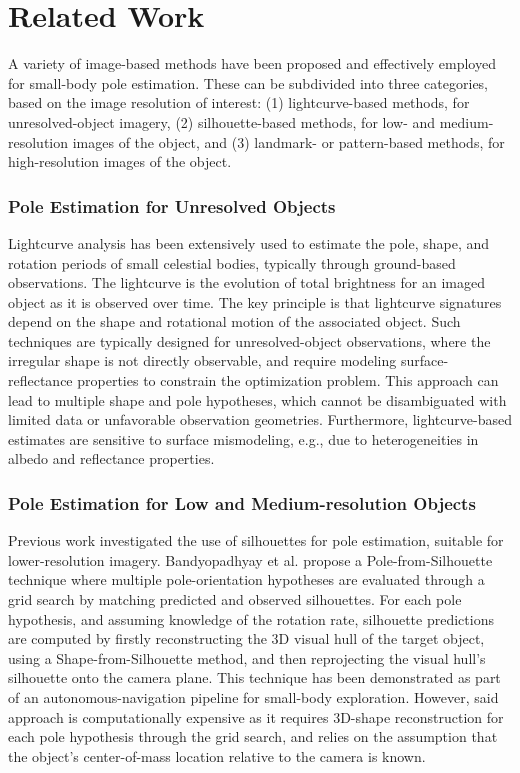 \section{Related Work}
A variety of image-based methods have been proposed and effectively employed for small-body pole estimation. These can be subdivided into three categories, based on the image resolution of interest: (1) lightcurve-based methods, for unresolved-object imagery, (2) silhouette-based methods, for low- and medium-resolution images of the object, and (3) landmark- or pattern-based methods, for high-resolution images of the object.

\subsubsection{Pole Estimation for Unresolved Objects}
Lightcurve analysis has been extensively used to estimate the pole, shape, and rotation periods of small celestial bodies, typically through ground-based observations\cite{kaasalainen2001optimization,chng2022globally}. The lightcurve is the evolution of total brightness for an imaged object as it is observed over time. The key principle is that lightcurve signatures depend on the shape and rotational motion of the associated object. Such techniques are typically designed for unresolved-object observations, where the irregular shape is not directly observable, and require modeling surface-reflectance properties to constrain the optimization problem. This approach can lead to multiple shape and pole hypotheses, which cannot be disambiguated with limited data or unfavorable observation geometries. Furthermore, lightcurve-based estimates are sensitive to surface mismodeling, e.g., due to heterogeneities in albedo and reflectance properties.

\subsubsection{Pole Estimation for Low and Medium-resolution Objects}

Previous work investigated the use of silhouettes for pole estimation, suitable for lower-resolution imagery. Bandyopadhyay et al. propose a Pole-from-Silhouette technique where multiple pole-orientation hypotheses are evaluated through a grid search by matching predicted and observed silhouettes\cite{bandyopadhyay2021light}. For each pole hypothesis, and assuming knowledge of the rotation rate, silhouette predictions are computed by firstly reconstructing the 3D visual hull of the target object, using a Shape-from-Silhouette method, and then reprojecting the visual hull's silhouette onto the camera plane. This technique has been demonstrated as part of an autonomous-navigation pipeline for small-body exploration\cite{nesnas2021autonomous}. However, said approach is computationally expensive as it requires 3D-shape reconstruction for each pole hypothesis through the grid search, and relies on the assumption that the object's center-of-mass location relative to the camera is known.


